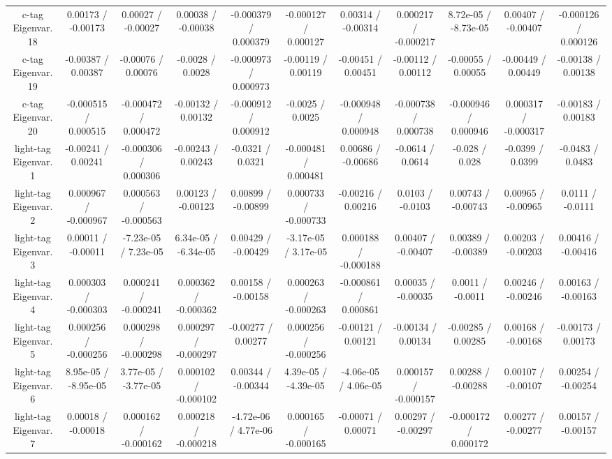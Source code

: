 \begin{table}[htbp]
\begin{center}
\begin{tabular}{|c|c|c|c|c|c|c|c|c|c|c|}
  c-tag Eigenvar. 18 & 0.00173 / -0.00173 & 0.00027 / -0.00027 & 0.00038 / -0.00038 & -0.000379 / 0.000379 & -0.000127 / 0.000127 & 0.00314 / -0.00314 & 0.000217 / -0.000217 & 8.72e-05 / -8.73e-05 & 0.00407 / -0.00407 & -0.000126 / 0.000126 \\ 
  c-tag Eigenvar. 19 & -0.00387 / 0.00387 & -0.00076 / 0.00076 & -0.0028 / 0.0028 & -0.000973 / 0.000973 & -0.00119 / 0.00119 & -0.00451 / 0.00451 & -0.00112 / 0.00112 & -0.00055 / 0.00055 & -0.00449 / 0.00449 & -0.00138 / 0.00138 \\ 
  c-tag Eigenvar. 20 & -0.000515 / 0.000515 & -0.000472 / 0.000472 & -0.00132 / 0.00132 & -0.000912 / 0.000912 & -0.0025 / 0.0025 & -0.000948 / 0.000948 & -0.000738 / 0.000738 & -0.000946 / 0.000946 & 0.000317 / -0.000317 & -0.00183 / 0.00183 \\ 
  light-tag Eigenvar. 1 & -0.00241 / 0.00241 & -0.000306 / 0.000306 & -0.00243 / 0.00243 & -0.0321 / 0.0321 & -0.000481 / 0.000481 & 0.00686 / -0.00686 & -0.0614 / 0.0614 & -0.028 / 0.028 & -0.0399 / 0.0399 & -0.0483 / 0.0483 \\ 
  light-tag Eigenvar. 2 & 0.000967 / -0.000967 & 0.000563 / -0.000563 & 0.00123 / -0.00123 & 0.00899 / -0.00899 & 0.000733 / -0.000733 & -0.00216 / 0.00216 & 0.0103 / -0.0103 & 0.00743 / -0.00743 & 0.00965 / -0.00965 & 0.0111 / -0.0111 \\ 
  light-tag Eigenvar. 3 & 0.00011 / -0.00011 & -7.23e-05 / 7.23e-05 & 6.34e-05 / -6.34e-05 & 0.00429 / -0.00429 & -3.17e-05 / 3.17e-05 & 0.000188 / -0.000188 & 0.00407 / -0.00407 & 0.00389 / -0.00389 & 0.00203 / -0.00203 & 0.00416 / -0.00416 \\ 
  light-tag Eigenvar. 4 & 0.000303 / -0.000303 & 0.000241 / -0.000241 & 0.000362 / -0.000362 & 0.00158 / -0.00158 & 0.000263 / -0.000263 & -0.000861 / 0.000861 & 0.00035 / -0.00035 & 0.0011 / -0.0011 & 0.00246 / -0.00246 & 0.00163 / -0.00163 \\ 
  light-tag Eigenvar. 5 & 0.000256 / -0.000256 & 0.000298 / -0.000298 & 0.000297 / -0.000297 & -0.00277 / 0.00277 & 0.000256 / -0.000256 & -0.00121 / 0.00121 & -0.00134 / 0.00134 & -0.00285 / 0.00285 & 0.00168 / -0.00168 & -0.00173 / 0.00173 \\ 
  light-tag Eigenvar. 6 & 8.95e-05 / -8.95e-05 & 3.77e-05 / -3.77e-05 & 0.000102 / -0.000102 & 0.00344 / -0.00344 & 4.39e-05 / -4.39e-05 & -4.06e-05 / 4.06e-05 & 0.000157 / -0.000157 & 0.00288 / -0.00288 & 0.00107 / -0.00107 & 0.00254 / -0.00254 \\ 
  light-tag Eigenvar. 7 & 0.00018 / -0.00018 & 0.000162 / -0.000162 & 0.000218 / -0.000218 & -4.72e-06 / 4.77e-06 & 0.000165 / -0.000165 & -0.00071 / 0.00071 & 0.00297 / -0.00297 & -0.000172 / 0.000172 & 0.00277 / -0.00277 & 0.00157 / -0.00157 \\ 

\end{tabular}
\end{center}
\end{table}

